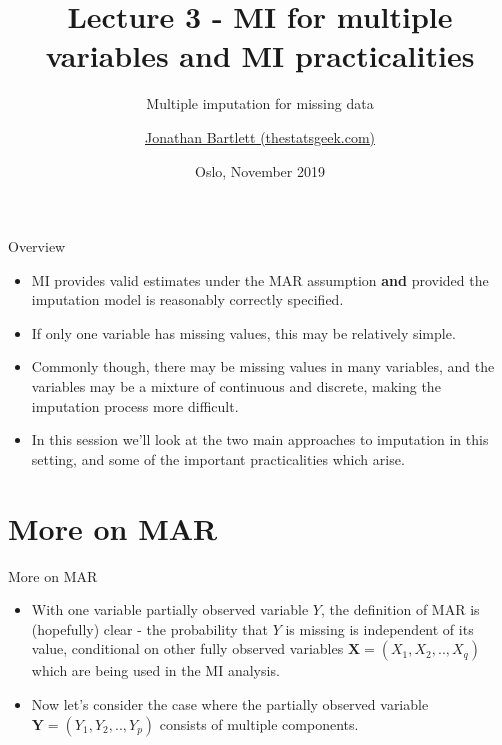 \documentclass[ignorenonframetext,]{beamer}
\title{Lecture 3 - MI for multiple variables and MI practicalities}
\subtitle{Multiple imputation for missing data}
\author{\href{https://thestatsgeek.com}{Jonathan Bartlett (thestatsgeek.com)}}
\date{Oslo, November 2019}
\providecommand{\tightlist}{%
  \setlength{\itemsep}{0pt}\setlength{\parskip}{0pt}}
\begin{document}
\frame{\titlepage}

\begin{frame}
\tableofcontents[hideallsubsections]
\end{frame}
\begin{frame}{Overview}
\protect\hypertarget{overview}{}

\begin{itemize}
\tightlist
\item
  MI provides valid estimates under the MAR assumption \textbf{and}
  provided the imputation model is reasonably correctly specified.
\item
  If only one variable has missing values, this may be relatively
  simple.
\item
  Commonly though, there may be missing values in many variables, and
  the variables may be a mixture of continuous and discrete, making the
  imputation process more difficult.
\item
  In this session we'll look at the two main approaches to imputation in
  this setting, and some of the important practicalities which arise.
\end{itemize}

\end{frame}

\hypertarget{more-on-mar}{%
\section{More on MAR}\label{more-on-mar}}

\begin{frame}{More on MAR}
\protect\hypertarget{more-on-mar-1}{}

\begin{itemize}
\tightlist
\item
  With one variable partially observed variable \(Y\), the definition of
  MAR is (hopefully) clear - the probability that \(Y\) is missing is
  independent of its value, conditional on other fully observed
  variables \(\mathbf X=(X_{1},X_{2},..,X_{q})\) which are being used in
  the MI analysis.
\item
  Now let's consider the case where the partially observed variable
  \(\mathbf Y=(Y_{1},Y_{2},..,Y_{p})\) consists of multiple components.
\end{itemize}

\end{frame}
\end{document}
